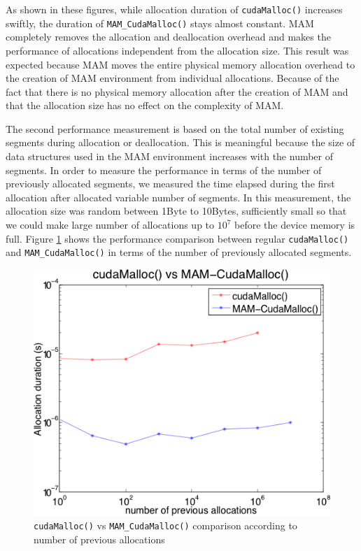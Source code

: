 \documentclass[conference]{IEEEtran}
\def\code#1{\texttt{#1}}
\begin{document}
As shown in these figures, while allocation duration of \code{cudaMalloc()} increases swiftly, the duration of \code{MAM\_CudaMalloc()} stays almost constant. MAM completely removes the allocation and deallocation overhead and makes the performance of allocations independent from the allocation size. This result was expected because MAM moves the entire physical memory allocation overhead to the creation of MAM environment from individual allocations.
Because of the fact that there is no physical memory allocation after the creation of MAM and that the allocation size has no effect on the complexity of MAM.

The second performance measurement is based on the total number of existing segments during allocation or deallocation. This is meaningful because the size of data structures used in the MAM environment increases with the number of segments. 
In order to measure the performance in terms of the number of previously allocated segments, we measured the time elapsed during the first allocation after allocated variable number of segments. In this measurement, the allocation size was random between 1Byte to 10Bytes, sufficiently small so that we could make large number of allocations up to $10^7$ before the device memory is full. Figure \ref{fig:cm-mcm-pa} shows the performance comparison between regular \code{cudaMalloc()} and \code{MAM\_CudaMalloc()} in terms of the number of previously allocated segments. 

\begin{figure}[h!]
\centering
  \includegraphics[width=0.8\linewidth]{cudamalloc-vs-mamcudamalloc-pa.png}
  \caption{\code{cudaMalloc()} vs \code{MAM\_CudaMalloc()} comparison according to number of previous allocations}
  \label{fig:cm-mcm-pa}
\end{figure}
\end{document}
